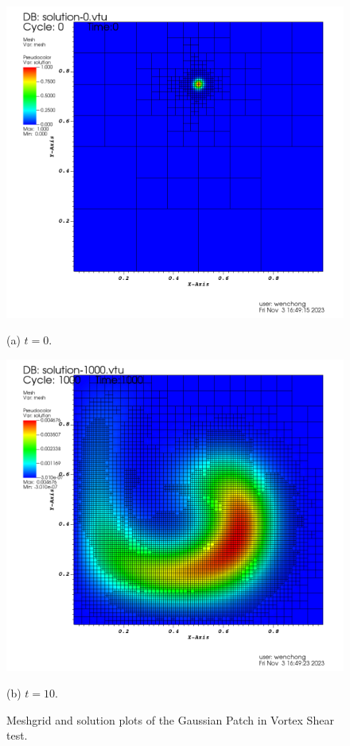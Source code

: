 \documentclass[lang=en,11pt,a4paper,bibend=bibtex]{elegantpaper}
\begin{document}
\begin{figure}[H]
    \centering
    \begin{minipage}[t]{0.45\linewidth}
        \centering
        \includegraphics[width=0.9\linewidth]{png/adv-dif-0.png}
        \caption*{(a) $t=0$.}
    \end{minipage}
    \begin{minipage}[t]{0.45\linewidth}
        \centering
        \includegraphics[width=0.9\linewidth]{png/adv-dif-1.png}
        \caption*{(b) $t=10$.}
    \end{minipage}
    \caption{Meshgrid and solution plots of the Gaussian Patch in 
    Vortex Shear test.}
\end{figure}
\end{document}
